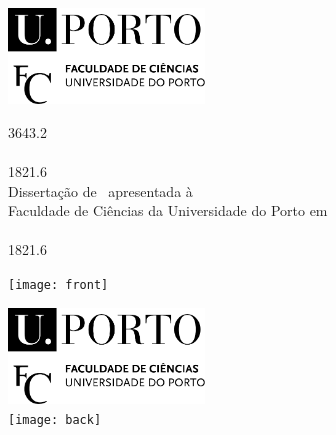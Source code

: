 \documentclass[11pt]{article}
\makeatletter
\newcommand\HUGE{\@setfontsize\Huge{36}{43.2}}
\newcommand\LargeA{\@setfontsize\Large{18}{21.6}}
\makeatother
\begin{document}
\newpage



\hspace{25mm}
\begin{minipage}[b][297mm][t]{125mm}
	\parbox[t]{125mm}{
		\raggedleft
		\vspace{19mm}
		
		\includegraphics[width=52mm]{fcup}\hspace{19mm}


	}
	\vfill
	\parbox[t][175mm][t]{125mm}{
		\raggedright
		{\HUGE \bfseries \fronttitle} \\
		 {\large~\\}
		{\LargeA \authorname \\} 
		{\large Dissertação de \ttype~apresentada à \\}
		{\large Faculdade de Ciências da Universidade do Porto em \\}
		{\large \fieldname \\}
		{\LargeA \the\year \\}
	}
\end{minipage}
\hfill
\begin{minipage}[b][297mm][b]{54.3mm}
	\texttt{[image: front]}
\end{minipage}

\newpage



\raggedright
\begin{minipage}[b][297mm][b]{54.3mm}
	\raggedleft
	\includegraphics[width=52mm]{fcup}
	~\\[8mm]
	\texttt{[image: back]}
\end{minipage}

\newpage
\end{document}
